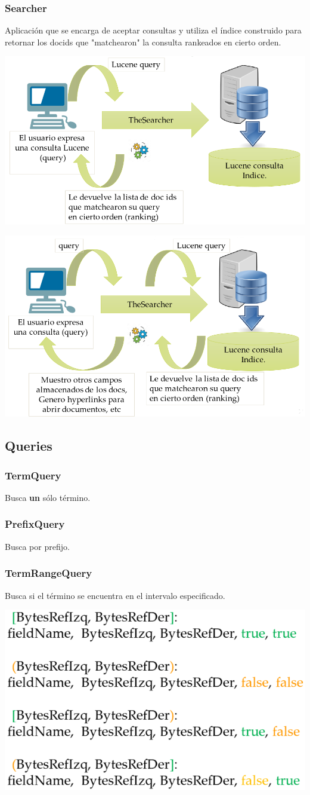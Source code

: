 \documentclass{article}
\begin{document}
\subsubsection{Searcher}
Aplicación que se encarga de aceptar consultas y utiliza el índice construido para retornar los docids que "matchearon" la consulta rankeados en cierto orden.
\begin{center}
    \includegraphics[width=.60\textwidth]{Images/Searcher.png}
\end{center}
\begin{center}
    \includegraphics[width=.60\textwidth]{Images/SearcherMejorado.png}
\end{center}

\subsection{Queries}
\subsubsection{TermQuery}
Busca \textbf{un} sólo término.

\subsubsection{PrefixQuery}
Busca por prefijo.

\subsubsection{TermRangeQuery}
Busca si el término se encuentra en el intervalo especificado.
\begin{center}
    \includegraphics[width=.40\textwidth]{Images/TermRangeQuery.png}
\end{center}
\end{document}

